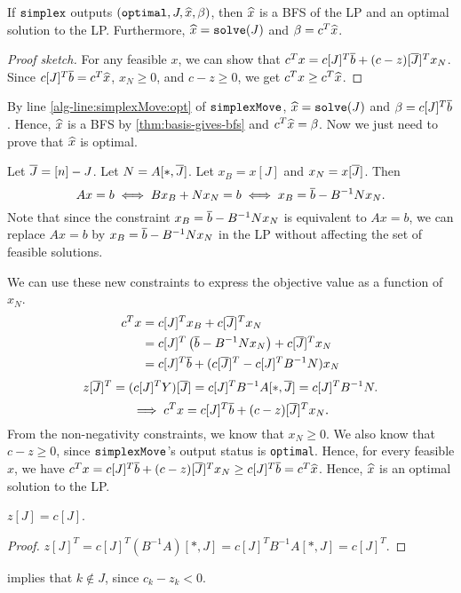 \begin{theorem}
\label{thm:simplex-optimal}
If $\operatorname{\mathtt{simplex}}$ outputs $(\mathtt{optimal}, J, \widehat{x}, \beta)$,
then $\widehat{x}$ is a BFS of the LP and an optimal solution to the LP.
Furthermore, $\widehat{x} = \operatorname{\mathtt{solve}}(J)$ and $\beta = c^T\widehat{x}$.
\end{theorem}
\begin{proof}[Proof sketch]
For any feasible $x$, we can show that $c^Tx = c[J]^T\overline{b} + (c-z)[\overline{J}]^Tx_N$.
Since $c[J]^T\overline{b} = c^T\widehat{x}$, $x_N \ge 0$, and $c - z \ge 0$,
we get $c^Tx \ge c^T\widehat{x}$.
\end{proof}
\begin{longProof}
By line \ref{alg-line:simplexMove:opt} of $\operatorname{\mathtt{simplexMove}}$,
$\widehat{x} = \operatorname{\mathtt{solve}}(J)$ and $\beta = c[J]^T\overline{b}$.
Hence, $\widehat{x}$ is a BFS by \cref{thm:basis-gives-bfs} and $c^T\widehat{x} = \beta$.
Now we just need to prove that $\widehat{x}$ is optimal.

Let $\overline{J} = [n] - J$. Let $N = A[*,\overline{J}]$.
Let $x_B = x[J]$ and $x_N = x[\overline{J}]$. Then
\[ Ax = b \iff Bx_B + Nx_N = b \iff x_B = \overline{b} - B^{-1}Nx_N. \]
Note that since the constraint $x_B = \overline{b} - B^{-1}Nx_N$ is equivalent to $Ax = b$,
we can replace $Ax = b$ by $x_B = \overline{b} - B^{-1}Nx_N$ in the LP without affecting
the set of feasible solutions.

We can use these new constraints to express the objective value as a function of $x_N$.
\begin{align*}
c^Tx &= c[J]^Tx_B + c[\overline{J}]^Tx_N
\\ &= c[J]^T\left(\overline{b} - B^{-1}Nx_N\right) + c[\overline{J}]^Tx_N
\\ &= c[J]^T\overline{b} + (c[\overline{J}]^T - c[J]^TB^{-1}N)x_N
\end{align*}
\[ z[\overline{J}]^T = (c[J]^TY)[\overline{J}] = c[J]^TB^{-1}A[*,\overline{J}] = c[J]^TB^{-1}N. \]
\[ \implies c^Tx = c[J]^T\overline{b} + (c-z)[\overline{J}]^Tx_N. \]
From the non-negativity constraints, we know that $x_N \ge 0$.
We also know that $c-z \ge 0$, since $\operatorname{\mathtt{simplexMove}}$'s output status is \texttt{optimal}.
Hence, for every feasible $x$, we have
$c^Tx = c[J]^T\overline{b} + (c-z)[\overline{J}]^Tx_N \ge c[J]^T\overline{b} = c^T\widehat{x}$.
Hence, $\widehat{x}$ is an optimal solution to the LP.
\end{longProof}

\begin{lemma}
\label{thm:zJ-eq-cJ}
$z[J] = c[J]$.
\end{lemma}
\begin{proof}
$z[J]^T = c[J]^T(B^{-1}A)[*,J] = c[J]^TB^{-1}A[*,J] = c[J]^T$.
\end{proof}
 implies that $k \not\in J$, since $c_k - z_k < 0$.

